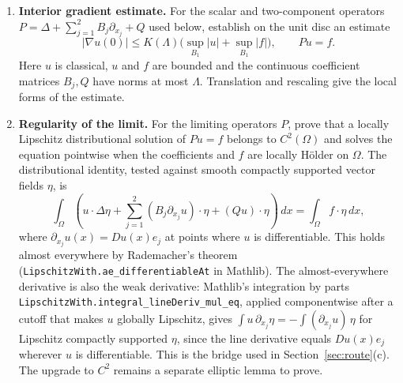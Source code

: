 \documentclass[11pt]{amsart}
\theoremstyle{definition}
\begin{document}
\begin{enumerate}[label=(A\arabic*)]
        nonpositive (also for $k=0$, and for $D_2$), so the maximum principle gives
        uniqueness for the homogeneous problem with zero data, and linear
        initial-value theory gives existence by shooting. The general existence
        theorem of Gilbarg--Trudinger (Theorem~6.13) is not needed. The estimates
        of Lemmas~5.2--5.4 and Proposition~5.5 are applied to the summed
        functions, not mode by mode, and must be uniform in the cutoff $N$ as well
        as in the admissible radii.
  \item \textbf{Interior gradient estimate.} For the scalar and two-component
        operators $P=\Delta+\sum_{j=1}^2 B_j\partial_{x_j}+Q$ used below,
        establish on the unit disc an estimate
        \[
            |\nabla u(0)|\le K(\Lambda)
                 \bigl(\sup_{B_1}|u|+\sup_{B_1}|f|\bigr),\qquad Pu=f.
        \]
        Here $u$ is classical, $u$ and $f$ are bounded and the continuous
        coefficient matrices $B_j,Q$ have norms at most $\Lambda$.
        Translation and rescaling give the local forms of the estimate.
  \item \textbf{Regularity of the limit.} For the limiting operators $P$,
        prove that a locally Lipschitz distributional solution of $Pu=f$
        belongs to $C^2(\Omega)$ and solves the equation pointwise when the
        coefficients and $f$ are locally H\"older on $\Omega$. The distributional
        identity, tested against smooth compactly supported vector fields $\eta$, is
        \[
          \int_\Omega\left(u\cdot\Delta\eta+
          \sum_{j=1}^2(B_j\partial_{x_j}u)\cdot\eta+
          (Qu)\cdot\eta\right)\,dx=\int_\Omega f\cdot\eta\,dx,
        \]
        where $\partial_{x_j}u(x)=Du(x)e_j$ at points where $u$ is
        differentiable. This holds almost everywhere by Rademacher's theorem
        (\texttt{LipschitzWith.ae\_differentiableAt} in Mathlib). The
        almost-everywhere derivative is also the weak derivative: Mathlib's
        integration by parts \texttt{LipschitzWith.integral\_lineDeriv\_mul\_eq},
        applied componentwise after a cutoff that makes $u$ globally Lipschitz,
        gives $\int u\,\partial_{x_j}\eta=-\int(\partial_{x_j}u)\,\eta$ for
        Lipschitz compactly supported $\eta$, since the line derivative equals
        $Du(x)e_j$ wherever $u$ is differentiable. This is the bridge used in
        Section~\ref{sec:route}(c). The upgrade to $C^2$ remains a separate
        elliptic lemma to prove.
\end{enumerate}
\end{document}
